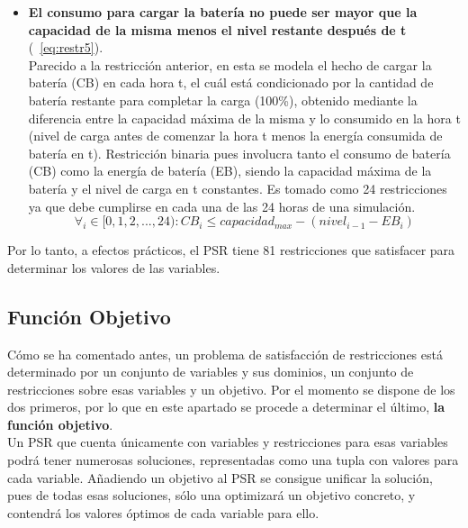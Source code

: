 \begin{itemize}
\item \textbf{El consumo para cargar la batería no puede ser mayor que la capacidad de la misma menos el nivel restante después de t} (~\ref{eq:restr5}).\\Parecido a la restricción anterior, en esta se modela el hecho de cargar la batería (CB) en cada hora t, el cuál está condicionado por la cantidad de batería restante para completar la carga (100\%), obtenido mediante la diferencia entre la capacidad máxima de la misma y lo consumido en la hora t (nivel de carga antes de comenzar la hora t menos la energía consumida de batería en t). Restricción binaria pues involucra tanto el consumo de batería (CB) como la energía de batería (EB), siendo la capacidad máxima de la batería y el nivel de carga en t constantes. Es tomado como 24 restricciones ya que debe cumplirse en cada una de las 24 horas de una simulación.
\begin{equation}
        \label{eq:restr5}
        \forall_{i} \in [0, 1, 2, ..., 24) : CB_{i} \leq capacidad_{max}- (nivel_{i-1} - EB_{i})
\end{equation}

\end{itemize}

Por lo tanto, a efectos prácticos, el PSR tiene 81 restricciones que satisfacer para determinar los valores de las variables.

\subsection{Función Objetivo}
Cómo se ha comentado antes, un problema de satisfacción de restricciones está determinado por un conjunto de variables y sus dominios, un conjunto de restricciones sobre esas variables y un objetivo. Por el momento se dispone de los dos primeros, por lo que en este apartado se procede a determinar el último, \textbf{la función objetivo}.\\

Un PSR que cuenta únicamente con variables y restricciones para esas variables podrá tener numerosas soluciones, representadas como una tupla con valores para cada variable. Añadiendo un objetivo al PSR se consigue unificar la solución, pues de todas esas soluciones, sólo una optimizará un objetivo concreto, y contendrá los valores óptimos de cada variable para ello.\\

